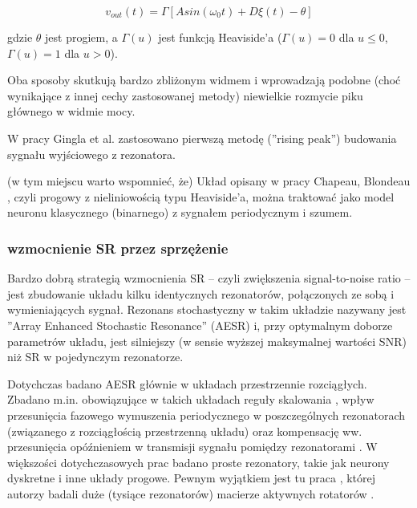   \begin{equation} \label{sr:gingl2}
    v_{out}(t) = \Gamma[A sin (\omega_0 t) + D \xi(t) - \theta]
  \end{equation}

  gdzie $\theta$ jest progiem, a $\Gamma(u)$ jest funkcją Heaviside'a ($\Gamma(u) = 0$ dla $u \leq 0$, $\Gamma(u) = 1$ dla $u > 0$).

  Oba sposoby skutkują bardzo zbliżonym widmem i wprowadzają podobne (choć wynikające z innej cechy zastosowanej metody) niewielkie rozmycie piku głównego w widmie mocy.

  W pracy Gingla et al. zastosowano pierwszą metodę (''rising peak'') budowania sygnału wyjściowego z rezonatora.

  (w tym miejscu warto wspomnieć, że) Układ opisany w pracy Chapeau, Blondeau \cite{blondeau_e53}, czyli progowy z nieliniowością typu Heaviside'a, można traktować jako model neuronu klasycznego (binarnego) z sygnałem periodycznym i szumem.

  \subsubsection{wzmocnienie SR przez sprzężenie}
  \label{sec:wzmocnienie_przez_sprzezenie}

  Bardzo dobrą strategią wzmocnienia SR -- czyli zwiększenia signal-to-noise ratio -- jest zbudowanie układu kilku identycznych rezonatorów, połączonych ze sobą i wymieniających sygnał. Rezonans stochastyczny w takim układzie nazywany jest ''Array Enhanced Stochastic Resonance'' (AESR) \cite{lindner_meadows} i, przy optymalnym doborze parametrów układu, jest silniejszy (w sensie wyższej maksymalnej wartości SNR) niż SR w pojedynczym rezonatorze.

  Dotychczas badano AESR głównie w układach przestrzennie rozciągłych. Zbadano m.in. obowiązujące w takich układach reguły skalowania \cite{lindner_meadows} \cite{tanabe_shimokawa}, wpływ przesunięcia fazowego wymuszenia periodycznego w poszczególnych rezonatorach (związanego z rozciągłością przestrzenną układu) \cite{ijmpb_14_8} oraz kompensację ww. przesunięcia opóźnieniem w transmisji sygnału pomiędzy rezonatorami \cite{ijmpb_23_2}. W większości dotychczasowych prac badano proste rezonatory, takie jak neurony dyskretne i inne układy progowe. Pewnym wyjątkiem jest tu praca \cite{tanabe_shimokawa}, której autorzy badali duże (tysiące rezonatorów) macierze aktywnych rotatorów \cite{wiesenfeld} \cite{pakdaman}.

